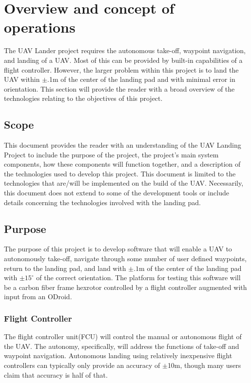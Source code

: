 
\chapter{Overview and concept of operations}
The UAV Lander project requires the autonomous take-off, waypoint navigation, and landing of a UAV. Most of this can be provided by built-in capabilities of a flight controller. However, the larger problem within this project is to land the UAV within $\pm$.1m of the center of the landing pad and with minimal error in orientation. This section will provide the reader with a broad overview of the technologies relating to the objectives of this project.


\section{Scope}
This document provides the reader with an understanding of the UAV Landing Project to include the purpose of the project, the project's main system components, how these components will function together, and a description of the technologies used to develop this project. This document is limited to the technologies that are/will be implemented on the build of the UAV. Necessarily, this document does not extend to some of the development tools or include details concerning the technologies involved with the landing pad.  

\section{Purpose}
The purpose of this project is to develop software that will enable a UAV to autonomously take-off, navigate through some number of user defined waypoints, return to the landing pad, and land with $\pm .1$m of the center of the landing pad with $\pm 15^{\circ}$ of the correct orientation. The platform for testing this software will be a carbon fiber frame hexrotor controlled by a flight controller augmented with input from an ODroid.  

\subsection{Flight Controller}
The flight controller unit(FCU) will control the manual or autonomous flight of the UAV. The autonomy, specifically, will address the functions of take-off and waypoint navigation. Autonomous landing using relatively inexpensive flight controllers can typically only provide an accuracy of $\pm$10m, though many users claim that accuracy is half of that. \\

